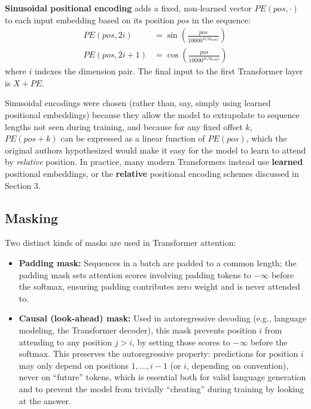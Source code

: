 \documentclass[11pt]{article}
\begin{document}
\begin{defbox}
\textbf{Sinusoidal positional encoding} adds a fixed, non-learned vector $PE(pos, \cdot)$ to each input embedding based on its position \(pos\) in the sequence:
\begin{align*}
PE(pos, 2i) &= \sin\left(\frac{pos}{10000^{2i/d_{model}}}\right) \\
PE(pos, 2i+1) &= \cos\left(\frac{pos}{10000^{2i/d_{model}}}\right)
\end{align*}
where $i$ indexes the dimension pair. The final input to the first Transformer layer is $X + PE$.
\end{defbox}

\begin{keyidea}
Sinusoidal encodings were chosen (rather than, say, simply using learned positional embeddings) because they allow the model to extrapolate to sequence lengths not seen during training, and because for any fixed offset $k$, $PE(pos+k)$ can be expressed as a linear function of $PE(pos)$, which the original authors hypothesized would make it easy for the model to learn to attend by \emph{relative} position. In practice, many modern Transformers instead use \textbf{learned} positional embeddings, or the \textbf{relative} positional encoding schemes discussed in Section 3.
\end{keyidea}

\subsection*{Masking}

Two distinct kinds of masks are used in Transformer attention:

\begin{itemize}[leftmargin=1.5em]
    \item \textbf{Padding mask:} Sequences in a batch are padded to a common length; the padding mask sets attention scores involving padding tokens to $-\infty$ before the softmax, ensuring padding contributes zero weight and is never attended to.
    \item \textbf{Causal (look-ahead) mask:} Used in autoregressive decoding (e.g., language modeling, the Transformer decoder), this mask prevents position $i$ from attending to any position $j > i$, by setting those scores to $-\infty$ before the softmax. This preserves the autoregressive property: predictions for position $i$ may only depend on positions $1, \ldots, i-1$ (or $i$, depending on convention), never on ``future'' tokens, which is essential both for valid language generation and to prevent the model from trivially ``cheating'' during training by looking at the answer.
\end{itemize}
\end{document}
